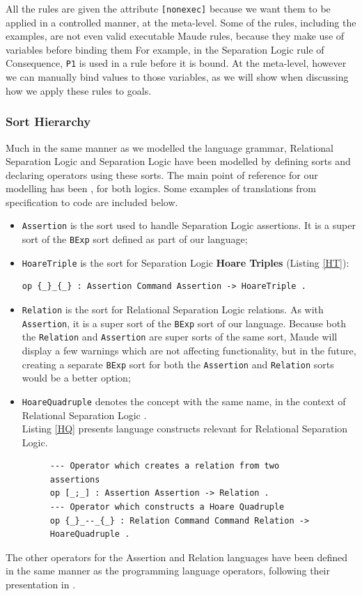\documentclass[12pt,a4paper]{article}
\begin{document}
All the rules are given the attribute \texttt{[nonexec]} because we want them to be applied in a controlled manner, at the meta-level. Some of the rules, including the examples, are not even valid executable Maude rules, because they make use of variables before binding them For example, in the Separation Logic rule of \textsf{Consequence}, \texttt{P1} is used in a rule before it is bound. At the meta-level, however we can manually bind values to those variables, as we will show when discussing how we apply these rules to goals.
\subsubsection{Sort Hierarchy}
Much in the same manner as we modelled the language grammar, Relational Separation Logic and Separation Logic have been modelled by defining sorts and declaring operators using these sorts. The main point of reference for our modelling has been \cite{relational}, for both logics. Some examples of translations from specification to code are included below.
\begin{itemize}
	\item \texttt{Assertion} is the sort used to handle Separation Logic assertions. It is a super sort of the \texttt{BExp} sort defined as part of our language;
	\item \texttt{HoareTriple} is the sort for Separation Logic \textbf{Hoare Triples} (Listing \ref{HT}):
	\begin{lstlisting}[caption=Hoare Triple constructor operator,label=HT]
op {_}_{_} : Assertion Command Assertion -> HoareTriple .\end{lstlisting}
	\item \texttt{Relation} is the sort for Relational Separation Logic relations. As with \texttt{Assertion}, it is a super sort of the \texttt{BExp} sort of our language. Because both the \texttt{Relation} and \texttt{Assertion} are super sorts of the same sort, Maude will display a few warnings which are not affecting functionality, but in the future, creating a separate \texttt{BExp} sort for both the \texttt{Assertion} and \texttt{Relation} sorts would be a better option;
	\item \texttt{HoareQuadruple} denotes the concept with the same name, in the context of Relational Separation Logic .\\
	Listing \ref{HQ} presents language constructs relevant for Relational Separation Logic.
	\begin{figure}[h]
	\begin{lstlisting}[caption=Examples of Relational Separation Logic specific constructs,label=HQ]
--- Operator which creates a relation from two assertions
op [_;_] : Assertion Assertion -> Relation .
--- Operator which constructs a Hoare Quadruple 
op {_}_--_{_} : Relation Command Command Relation -> HoareQuadruple .\end{lstlisting}
	\end{figure}
\end{itemize}
The other operators for the Assertion and Relation languages have been defined in the same manner as the programming language operators, following their presentation in \cite{relational}.
\end{document}
